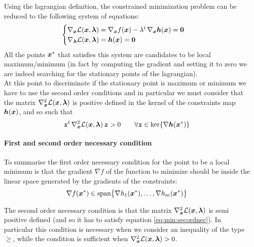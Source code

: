 	Using the lagrangian definition, the constrained minimization problem can be reduced to the following system of equations:
	\begin{equation}
	\begin{cases}		
		\nabla_{\boldsymbol{x}} \mathcal L(\boldsymbol{x},\boldsymbol{\lambda}) = \nabla_{\boldsymbol{x}} f(\boldsymbol{x}) - \lambda^t\, \nabla_{\boldsymbol{x}} \boldsymbol{h}(\boldsymbol{x}) = \boldsymbol{0} \\
		\nabla_{\boldsymbol{\lambda}} \mathcal L(\boldsymbol{x}, \boldsymbol{\lambda}) = \boldsymbol{h}(\boldsymbol{x}) = \boldsymbol{0}
	\end{cases}
	\end{equation}
	All the points $\boldsymbol{x}^*$ that satisfies this system are candidates to be local maximum/minimum (in fact by computing the gradient and setting it to zero we are indeed searching for the stationary points of the lagrangian).\\
	At this point to discriminate if the stationary point is maximum or minimum we have to use the second order conditions and in particular we must consider that the matrix $\nabla_{\boldsymbol{x}}^2 \mathcal L(\boldsymbol{x},\boldsymbol{\lambda})$ is positive defined in the kernel of the constraints map $\boldsymbol{h}(\boldsymbol{x})$, and so such that
	\begin{equation} \label{eq:min:secordnec}
		\boldsymbol{z}^t \, \nabla_{\boldsymbol{x}}^2\mathcal L(\boldsymbol{x},\boldsymbol{\lambda})\, \boldsymbol{z} > 0 \qquad \forall \boldsymbol{z} \in \ker\{ \nabla\boldsymbol{h}(\boldsymbol{x}^*) \}
	\end{equation}
	
	
	\paragraph{First and second order necessary condition} To summarise the first order necessary condition for the point to be a local minimum is that the gradient $\nabla f$ of the function to minimize should be inside the linear space generated by the gradients of the constraints:
	\[ \nabla f(\boldsymbol{x}^*) \in \textrm{span} \big\{ \nabla h_1(\boldsymbol{x}^*),\dots, \nabla h_m(\boldsymbol{x}^*) \big\} \]
	
	The second order necessary condition is that the matrix $\nabla_{\boldsymbol{x}}^2 \mathcal L(\boldsymbol{x},\boldsymbol{\lambda})$ is semi positive defined (and so it has to satisfy equation \ref{eq:min:secordnec}). In particular this condition is necessary when we consider an inequality of the type $\geq$, while the condition is sufficient when $\nabla_{\boldsymbol{x}}^2 \mathcal L(\boldsymbol{x},\boldsymbol{\lambda}) > 0$.
	
